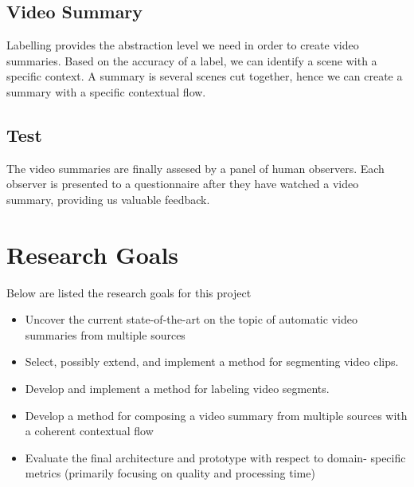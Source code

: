 \subsection{Video Summary}
%
Labelling provides the abstraction level we need in order to create video summaries. Based on the accuracy of a label, we can identify a scene with a specific context. A summary is several scenes cut together, hence we can create a summary with a specific contextual flow.
%
\subsection{Test}
%
The video summaries are finally assesed by a panel of human observers. Each observer is presented to a questionnaire after they have watched a video summary, providing us valuable feedback.
%
\section{Research Goals}
%
Below are listed the research goals for this project
%
\begin{itemize}
\item Uncover the current state-of-the-art on the topic of automatic video summaries from multiple sources
\item Select, possibly extend, and implement a method for segmenting video clips.
\item Develop and implement a method for labeling video segments.
\item Develop a method for composing a video summary from multiple sources with a coherent contextual flow
\item Evaluate the final architecture and prototype with respect to domain- specific metrics (primarily focusing on quality and processing time)
\end{itemize}
%
